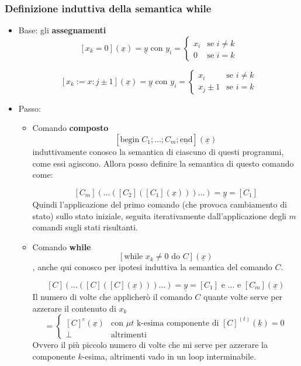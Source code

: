 \documentclass{article}
\begin{document}
\subsubsection{Definizione induttiva della semantica while}
\begin{itemize}
    \item Base: gli \textbf{assegnamenti}
          \[
              [x_k=0](\underline{x})=\underline{y}\text{ con }y_i=
              \begin{cases}
                  x_i & \text{se }i\neq k \\
                  0   & \text{se }i=k
              \end{cases}
          \]

          \[
              [x_k:=x:j \pm 1](\underline{x})=\underline{y}\text{ con }y_i=
              \begin{cases}
                  x_i       & \text{se } i\neq k \\
                  x_j \pm 1 & \text{se } i=k
              \end{cases}
          \]


    \item Passo:
          \begin{itemize}
              \item Comando \textbf{composto}
                    $$[\underline{\text{begin}}\;C_1;...;C_m;\underline{\text{end}}](\underline{x})$$
                    induttivamente conosco la semantica di ciascuno di questi programmi, come essi agiscono.
                    Allora posso definire la semantica di questo comando come:

                    $$[C_m](\dots([C_2]([C_1](\underline{x})))\dots)=\underline{y}=[C_1]$$
                    Quindi l'applicazione del primo comando (che provoca cambiamento di stato)
                    sullo stato iniziale, seguita iterativamente dall'applicazione degli $m$ comandi
                    sugli stati risultanti.

              \item Comando \textbf{while}
                    $$[\text{while }x_k\neq 0 \text{ do }C](\underline{x})$$, anche qui conosco
                    per ipotesi induttiva la semantica del comando $C$.

                    $$[C](\dots([C]([C](\underline{x})))\dots)=\underline{y}=[C_1]\text{ e }...\text{ e }[C_m](\underline{x})$$
                    Il numero di volte che applicherò il comando $C$ quante volte serve per azzerare il contenuto di $x_k$
                    \[
                        =\begin{cases}
                            [C]^e(\underline{x}) & \text{con }\mu t \text{ k-esima componente di }[C]^{(t)}(\underline{k})=0 \\
                            \bot                 & \text{altrimenti}
                        \end{cases}
                    \]
                    Ovvero il più piccolo numero di volte che mi serve per azzerare la componente $k$-esima, altrimenti
                    vado in un loop interminabile.
          \end{itemize}


\end{itemize}
\end{document}
